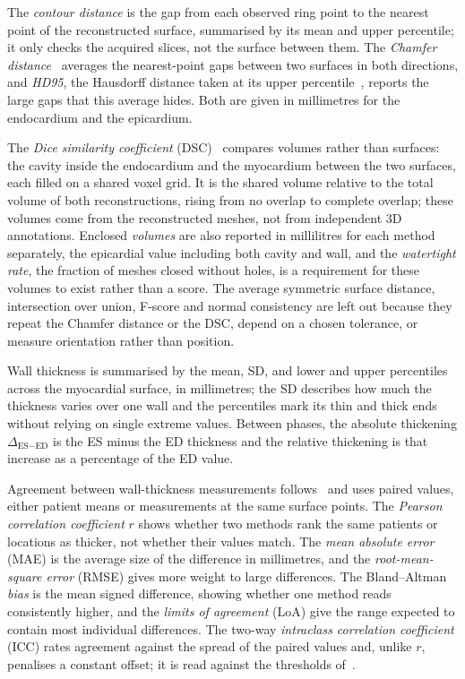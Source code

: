 The \emph{contour distance} is the gap from each observed ring point to the
nearest point of the reconstructed surface, summarised by its mean and upper
percentile; it only checks the acquired slices, not the surface between them.
The \emph{Chamfer distance}~\parencite{deepsdf2019} averages the nearest-point
gaps between two surfaces in both directions, and \emph{HD95}, the Hausdorff
distance taken at its upper percentile~\parencite{taha2015metrics}, reports
the large gaps that this average hides. Both are given in millimetres for the
endocardium and the epicardium.

The \emph{Dice similarity coefficient} (DSC)~\parencite{taha2015metrics}
compares volumes rather than surfaces: the cavity inside the endocardium and
the myocardium between the two surfaces, each filled on a shared voxel grid.
It is the shared volume relative to the total volume of both reconstructions,
rising from no overlap to complete overlap; these volumes come from the
reconstructed meshes, not from independent 3D annotations. Enclosed
\emph{volumes} are also reported in millilitres for each method separately,
the epicardial value including both cavity and wall, and the \emph{watertight
rate}, the fraction of meshes closed without holes, is a requirement for these
volumes to exist rather than a score. The average symmetric surface distance,
intersection over union, F-score and normal consistency are left out because
they repeat the Chamfer distance or the DSC, depend on a chosen tolerance, or
measure orientation rather than position.

Wall thickness is summarised by the mean, SD, and lower and upper percentiles
across the myocardial surface, in millimetres; the SD describes how much the
thickness varies over one wall and the percentiles mark its thin and thick
ends without relying on single extreme values. Between phases, the absolute
thickening $\Delta_{\text{ES}-\text{ED}}$ is the ES minus the ED thickness and
the relative thickening is that increase as a percentage of the ED value.

Agreement between wall-thickness measurements follows~\textcite{blandaltman1986}
and uses paired values, either patient means or measurements at the same
surface points. The \emph{Pearson correlation coefficient} $r$ shows whether
two methods rank the same patients or locations as thicker, not whether their
values match. The \emph{mean absolute error} (MAE) is the average size of the
difference in millimetres, and the \emph{root-mean-square error} (RMSE) gives
more weight to large differences. The Bland--Altman \emph{bias} is the mean
signed difference, showing whether one method reads consistently higher, and
the \emph{limits of agreement} (LoA) give the range expected to contain most
individual differences. The two-way \emph{intraclass correlation coefficient}
(ICC) rates agreement against the spread of the paired values and, unlike
$r$, penalises a constant offset; it is read against the thresholds
of~\textcite{koo2016icc}.

